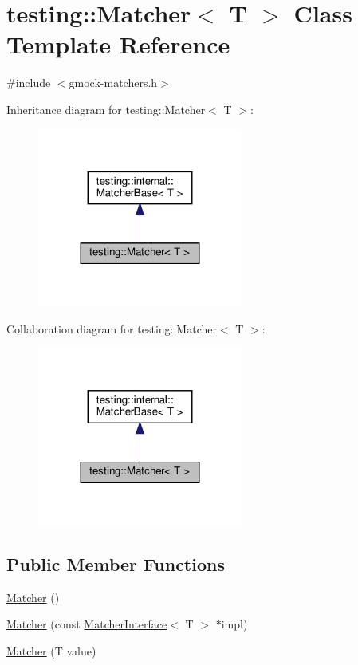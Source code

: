 \hypertarget{classtesting_1_1_matcher}{}\section{testing\+:\+:Matcher$<$ T $>$ Class Template Reference}
\label{classtesting_1_1_matcher}


{\ttfamily \#include $<$gmock-\/matchers.\+h$>$}



Inheritance diagram for testing\+:\+:Matcher$<$ T $>$\+:
\nopagebreak
\begin{figure}[H]
\begin{center}
\leavevmode
\includegraphics[width=191pt]{classtesting_1_1_matcher__inherit__graph}
\end{center}
\end{figure}


Collaboration diagram for testing\+:\+:Matcher$<$ T $>$\+:
\nopagebreak
\begin{figure}[H]
\begin{center}
\leavevmode
\includegraphics[width=191pt]{classtesting_1_1_matcher__coll__graph}
\end{center}
\end{figure}
\subsection*{Public Member Functions}
\begin{DoxyCompactItemize}
\item 
\hyperlink{classtesting_1_1_matcher_a57bfc9e62d7f6acfee5ad88d1077931c}{Matcher} ()
\item 
\hyperlink{classtesting_1_1_matcher_aea32eb3f86233853de91929fb2691bf3}{Matcher} (const \hyperlink{classtesting_1_1_matcher_interface}{Matcher\+Interface}$<$ T $>$ $\ast$impl)
\item 
\hyperlink{classtesting_1_1_matcher_adc75e0bd47ffc75ba8a5f760372d0493}{Matcher} (T value)
\end{DoxyCompactItemize}
